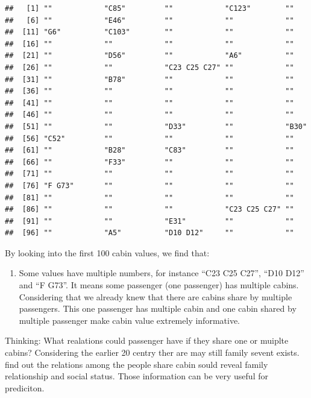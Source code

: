 \documentclass[
]{book}
\providecommand{\tightlist}{%
  \setlength{\itemsep}{0pt}\setlength{\parskip}{0pt}}
\begin{document}
\begin{verbatim}
##   [1] ""            "C85"         ""            "C123"        ""           
##   [6] ""            "E46"         ""            ""            ""           
##  [11] "G6"          "C103"        ""            ""            ""           
##  [16] ""            ""            ""            ""            ""           
##  [21] ""            "D56"         ""            "A6"          ""           
##  [26] ""            ""            "C23 C25 C27" ""            ""           
##  [31] ""            "B78"         ""            ""            ""           
##  [36] ""            ""            ""            ""            ""           
##  [41] ""            ""            ""            ""            ""           
##  [46] ""            ""            ""            ""            ""           
##  [51] ""            ""            "D33"         ""            "B30"        
##  [56] "C52"         ""            ""            ""            ""           
##  [61] ""            "B28"         "C83"         ""            ""           
##  [66] ""            "F33"         ""            ""            ""           
##  [71] ""            ""            ""            ""            ""           
##  [76] "F G73"       ""            ""            ""            ""           
##  [81] ""            ""            ""            ""            ""           
##  [86] ""            ""            ""            "C23 C25 C27" ""           
##  [91] ""            ""            "E31"         ""            ""           
##  [96] ""            "A5"          "D10 D12"     ""            ""
\end{verbatim}

By looking into the first 100 cabin values, we find that:

\begin{enumerate}
\def\labelenumi{\arabic{enumi}.}
\setcounter{enumi}{2}
\tightlist
\item
  Some values have multiple numbers, for instance ``C23 C25 C27'', ``D10 D12'' and ``F G73''. It means some passenger (one passenger) has multiple cabins.
  Considering that we already knew that there are cabins share by multiple passengers. This one passenger has multiple cabin and one cabin shared by multiple passenger make cabin value extremely informative.
\end{enumerate}

\begin{rmdthinking}
Thinking:
What realations could passenger have if they share one or muiplte cabins?
Considering the earlier 20 centry ther are may still family sevent exists.
find out the relations among the people share cabin sould reveal family relationship and social status. Those information can be very useful for prediciton.\\
\end{rmdthinking}
\end{document}
